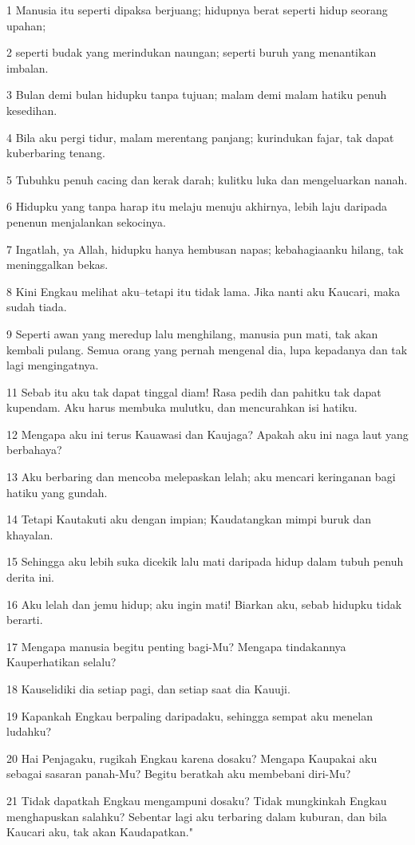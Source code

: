 \par 1 Manusia itu seperti dipaksa berjuang; hidupnya berat seperti hidup seorang upahan;
\par 2 seperti budak yang merindukan naungan; seperti buruh yang menantikan imbalan.
\par 3 Bulan demi bulan hidupku tanpa tujuan; malam demi malam hatiku penuh kesedihan.
\par 4 Bila aku pergi tidur, malam merentang panjang; kurindukan fajar, tak dapat kuberbaring tenang.
\par 5 Tubuhku penuh cacing dan kerak darah; kulitku luka dan mengeluarkan nanah.
\par 6 Hidupku yang tanpa harap itu melaju menuju akhirnya, lebih laju daripada penenun menjalankan sekocinya.
\par 7 Ingatlah, ya Allah, hidupku hanya hembusan napas; kebahagiaanku hilang, tak meninggalkan bekas.
\par 8 Kini Engkau melihat aku--tetapi itu tidak lama. Jika nanti aku Kaucari, maka sudah tiada.
\par 9 Seperti awan yang meredup lalu menghilang, manusia pun mati, tak akan kembali pulang. Semua orang yang pernah mengenal dia, lupa kepadanya dan tak lagi mengingatnya.
\par 11 Sebab itu aku tak dapat tinggal diam! Rasa pedih dan pahitku tak dapat kupendam. Aku harus membuka mulutku, dan mencurahkan isi hatiku.
\par 12 Mengapa aku ini terus Kauawasi dan Kaujaga? Apakah aku ini naga laut yang berbahaya?
\par 13 Aku berbaring dan mencoba melepaskan lelah; aku mencari keringanan bagi hatiku yang gundah.
\par 14 Tetapi Kautakuti aku dengan impian; Kaudatangkan mimpi buruk dan khayalan.
\par 15 Sehingga aku lebih suka dicekik lalu mati daripada hidup dalam tubuh penuh derita ini.
\par 16 Aku lelah dan jemu hidup; aku ingin mati! Biarkan aku, sebab hidupku tidak berarti.
\par 17 Mengapa manusia begitu penting bagi-Mu? Mengapa tindakannya Kauperhatikan selalu?
\par 18 Kauselidiki dia setiap pagi, dan setiap saat dia Kauuji.
\par 19 Kapankah Engkau berpaling daripadaku, sehingga sempat aku menelan ludahku?
\par 20 Hai Penjagaku, rugikah Engkau karena dosaku? Mengapa Kaupakai aku sebagai sasaran panah-Mu? Begitu beratkah aku membebani diri-Mu?
\par 21 Tidak dapatkah Engkau mengampuni dosaku? Tidak mungkinkah Engkau menghapuskan salahku? Sebentar lagi aku terbaring dalam kuburan, dan bila Kaucari aku, tak akan Kaudapatkan."

